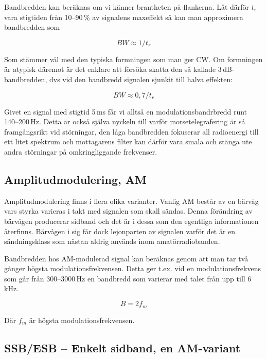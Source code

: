 Bandbredden kan beräknas om vi känner brantheten på flankerna. Låt därför $t_r$ vara
stigtiden från 10--90\,\% av signalens maxeffekt så kan man approximera bandbredden som

\begin{equation}
	BW \approx 1/t_r
\end{equation}

Som stämmer väl med den typiska formningen som man ger CW. Om formningen är atypisk däremot är det enklare att försöka skatta den så kallade 3\,dB-bandbredden, dvs vid den bandbredd signalen sjunkit till halva effekten:

\begin{equation}
	BW \approx 0,7/t_r
\end{equation}

Givet en signal med stigtid 5\,ms får vi alltså en modulationsbandrbredd runt 140--200\,Hz. Detta är också själva nyckeln till varför morsetelegrafering är så framgångsrikt vid störningar, den låga bandbredden fokuserar all radioenergi till ett litet spektrum och mottagarens filter kan därför vara smala och stänga ute andra störningar på omkringliggande frekvenser.

\subsection{Amplitudmodulering, AM}

Amplitudmodulering finns i flera olika varianter. Vanlig AM består av en
bärvåg vars styrka varieras i takt med signalen som skall sändas. Denna
förändring av bärvågen producerar sidband och det är i dessa som den egentliga
informationen återfinns. Bärvågen i sig får dock lejonparten av signalen
varför det är en sändningsklass som nästan aldrig används inom
amatörradiobanden.

Bandbredden hos AM-modulerad signal kan beräknas genom att man tar två gånger
högsta modulationsfrekvensen. Detta ger t.ex. vid en modulationsfrekvens som
går från 300--3000\,Hz en bandbredd som varierar med talet från upp till
6\,kHz.

\begin{equation}
	B=2f_m
\end{equation}

Där $f_m$ är högsta modulationsfrekvensen.

\subsection{SSB/ESB -- Enkelt sidband, en AM-variant}
    
 

